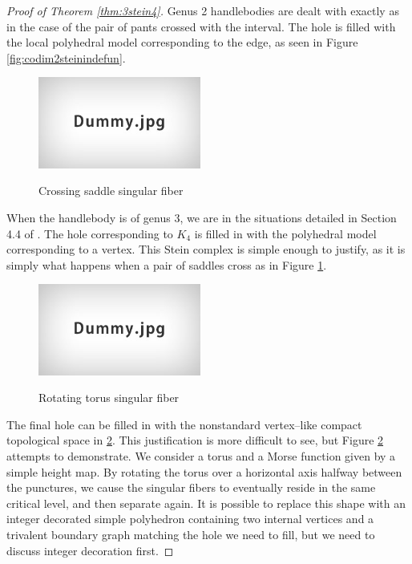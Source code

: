 \begin{proof}[Proof of Theorem \ref{thm:3stein4}]
	Genus 2 handlebodies are dealt with exactly as in the case of the pair of pants crossed with the interval.
	The hole is filled with the local polyhedral model corresponding to the edge, as seen in Figure \ref{fig:codim2steinindefun}.
	
	\begin{figure}
		\centering
		\captionsetup{justification=centering}
		\caption{Crossing saddle singular fiber}
		\includegraphics[height=3cm]{figures/dummy.jpg}
		\label{fig:crossingsaddles}
	\end{figure}
	
	When the handlebody is of genus 3, we are in the situations detailed in Section 4.4 of \cite{CostThur08}.
	The hole corresponding to $K_4$ is filled in with the polyhedral model corresponding to a vertex.
	This Stein complex is simple enough to justify, as it is simply what happens when a pair of saddles cross as in Figure \ref{fig:crossingsaddles}.

	\begin{figure}
		\centering
		\captionsetup{justification=centering}
		\caption{Rotating torus singular fiber}
		\includegraphics[height=3cm]{figures/dummy.jpg}
		\label{fig:doublecone}
	\end{figure}
	
	The final hole can be filled in with the nonstandard vertex--like compact topological space in \ref{fig:doublecone}.
	This justification is more difficult to see, but Figure \ref{fig:doublecone} attempts to demonstrate.
	We consider a torus and a Morse function given by a simple height map.
	By rotating the torus over a horizontal axis halfway between the punctures, we cause the singular fibers to eventually reside in the same critical level, and then separate again.
	It is possible to replace this shape with an integer decorated simple polyhedron containing two internal vertices and a trivalent boundary graph matching the hole we need to fill, but we need to discuss integer decoration first.
	

\end{proof}
